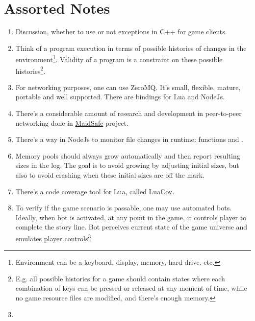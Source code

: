 \documentclass[12pt]{article}
\newcommand{\mylstinline}[2]{\fbox{\lstinline[language=#1]{#2}}}
\begin{document}
\section{Assorted Notes}

\begin{enumerate}
    \item
        \href{http://gamedev.stackexchange.com/questions/46424/try-catch-or-%
ifs-for-error-handling-in-c}%
        {Discussion}, whether to use or not exceptions in C++ for game clients.
    \item
        Think of a program execution in terms of possible histories of
        changes in the environment\footnote{
            Environment can be a keyboard, display, memory, hard drive, etc.
        }.
        Validity of a program is a constraint on these possible
        histories\footnote{
            E.g. all possible histories for a game should contain states where
            each combination of keys can be pressed or released at any moment
            of time, while no game resource files are modified, and
            there's enough memory.
        }.
    \item
        For networking purposes, one can use ZeroMQ.
        It's small, flexible, mature, portable and well supported.
        There are bindings for Lua and NodeJs.
    \item
        There's a considerable amount of research and development in
        peer-to-peer networking done in
        \href{http://maidsafe.net/}{MaidSafe} project.
    \item
        There's a way in NodeJs to monitor file changes in runtime:
        functions \mylstinline{bash}{fs.watch} and
        \mylstinline{bash}{fs.watchFile}.
    \item
        Memory pools should always grow automatically and then report
        resulting sizes in the log.
        The goal is to avoid growing by adjusting initial sizes, but also
        to avoid crashing when these initial sizes are off the mark.
    \item
        There's a code coverage tool for Lua, called
        \href{https://github.com/keplerproject/luacov}{LuaCov}.
    \item
        To verify if the game scenario is passable, one may use automated bots.
        Ideally, when bot is activated, at any point in the game,
        it controls player to complete the story line.
        Bot perceives current state of the game universe and emulates
        player controls\footnote{
}
\end{enumerate}
\end{document}
